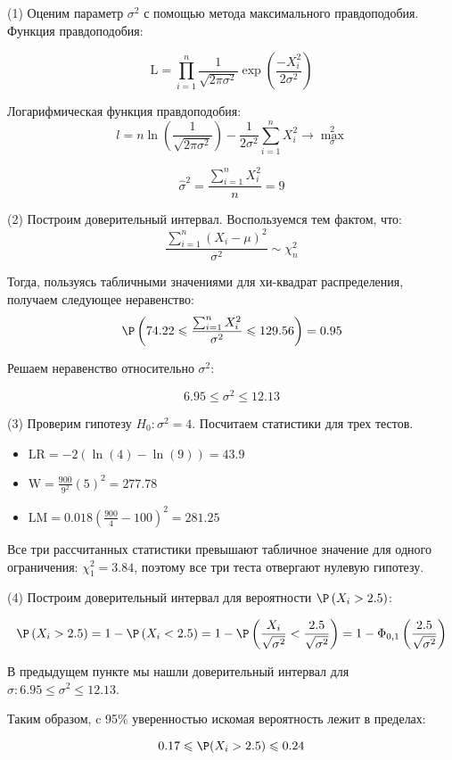 \documentclass[pdftex,11pt,openany]{book}\usepackage[]{graphicx}\usepackage[]{color}
\begin{document}
\begin{solution}
(1) Оценим параметр $\sigma^2$ с помощью метода максимального правдоподобия. Функция правдоподобия:

\[\text{L} = \prod_{i=1}^{n} \frac{1}{\sqrt{2\pi\sigma^2}}\exp\left( \frac{- X_i ^2}{2\sigma^2}\right) \]

Логарифмическая функция правдоподобия:
\[l = n \ln \left( \frac{1}{\sqrt{2\pi\sigma^2}}\right) - \frac{1}{2\sigma^2}\sum_{i=1}^{n}X_i^2 \to \max_\sigma^2\]

\[\hat{\sigma}^2 = \frac{\sum_{i=1}^{n}X_i^2}{n} = 9\]

(2) Построим доверительный интервал. Воспользуемся тем фактом, что:
\[\frac{\sum_{i=1}^{n}(X_i - \mu)^2}{\sigma^2} \sim \chi^2_n\]

Тогда, пользуясь табличными значениями для хи-квадрат распределения, получаем следующее неравенство:
\[\P\left( 74.22 \leqslant \frac{\sum_{i=1}^{n}X_i^2}{\sigma^2} \leqslant 129.56 \right) = 0.95 \]

Решаем неравенство относительно $\sigma^2$:

\[6.95 \leqslant \sigma^2 \leqslant 12.13\]

(3) Проверим гипотезу $H_0: \sigma^2 = 4$. Посчитаем статистики для трех тестов.
\begin{itemize}
  \item $\text{LR} = -2\left(\ln(4) - \ln(9)\right) = 43.9$
	\item $\text{W} = \frac{900}{9^2}(5)^2 = 277.78$
	\item $\text{LM} = 0.018\left( \frac{900}{4}-100\right)^2 = 281.25$
\end{itemize}

Все три рассчитанных статистики превышают табличное значение для одного ограничения: $\chi^2_1 = 3.84$, поэтому все три теста отвергают нулевую гипотезу.

(4) Построим доверительный интервал для вероятности $\P\left( X_i>2.5\right)$:

\[\P\left( X_i>2.5\right) = 1 - \P\left( X_i<2.5\right)  = 1 - \P\left(\frac{X_i}{\sqrt{\sigma^2}} < \frac{2.5}{\sqrt{\sigma^2}} \right) = 1 - \Phi_{0,1}\left( \frac{2.5}{\sqrt{\sigma^2}}\right) \]

В предыдущем пункте мы нашли доверительный интервал для $\sigma: 6.95 \leqslant \sigma^2 \leqslant 12.13$.

Таким образом, c 95\% уверенностью искомая вероятность лежит в пределах:

\[0.17 \leqslant \P(X_i>2.5) \leqslant 0.24\]
\end{solution}
\end{document}
